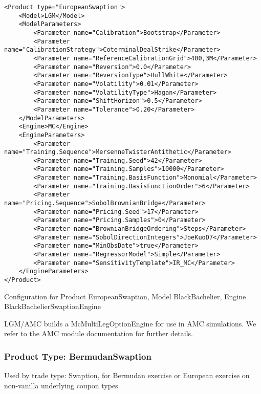 \begin{longlisting}
\begin{verbatim}
<Product type="EuropeanSwaption">
    <Model>LGM</Model>
    <ModelParameters>
        <Parameter name="Calibration">Bootstrap</Parameter>
        <Parameter name="CalibrationStrategy">CoterminalDealStrike</Parameter>
        <Parameter name="ReferenceCalibrationGrid">400,3M</Parameter>
        <Parameter name="Reversion">0.0</Parameter>
        <Parameter name="ReversionType">HullWhite</Parameter>
        <Parameter name="Volatility">0.01</Parameter>
        <Parameter name="VolatilityType">Hagan</Parameter>
        <Parameter name="ShiftHorizon">0.5</Parameter>
        <Parameter name="Tolerance">0.20</Parameter>
    </ModelParameters>
    <Engine>MC</Engine>
    <EngineParameters>
        <Parameter name="Training.Sequence">MersenneTwisterAntithetic</Parameter>
        <Parameter name="Training.Seed">42</Parameter>
        <Parameter name="Training.Samples">10000</Parameter>
        <Parameter name="Training.BasisFunction">Monomial</Parameter>
        <Parameter name="Training.BasisFunctionOrder">6</Parameter>
        <Parameter name="Pricing.Sequence">SobolBrownianBridge</Parameter>
        <Parameter name="Pricing.Seed">17</Parameter>
        <Parameter name="Pricing.Samples">0</Parameter>
        <Parameter name="BrownianBridgeOrdering">Steps</Parameter>
        <Parameter name="SobolDirectionIntegers">JoeKuoD7</Parameter>
        <Parameter name="MinObsDate">true</Parameter>
        <Parameter name="RegressorModel">Simple</Parameter>
        <Parameter name="SensitivityTemplate">IR_MC</Parameter>
    </EngineParameters>
</Product>
\end{verbatim}
\caption{Configuration for Product EuropeanSwaption, Model BlackBachelier, Engine BlackBachelierSwaptionEngine}
\label{lst:peconfig_EuropeanSwaption_LGM_MC}
\end{longlisting}

LGM/AMC builds a McMultiLegOptionEngine for use in AMC simulations. We refer to the AMC module documentation for further
details.

\subsubsection{Product Type: BermudanSwaption}

Used by trade type: Swaption, for Bermudan exercise or European exercise on non-vanilla underlying coupon types

